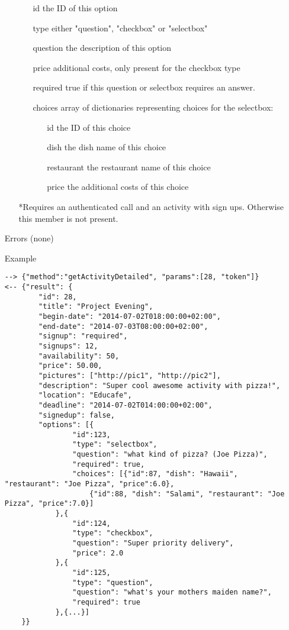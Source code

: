 \documentclass[a4paper]{scrreprt}
\begin{document}
\begin{enumerate}
\begin{enumerate}
\begin{enumerate}
        \item[id] the ID of this option
        \item[type] either "question", "checkbox" or "selectbox"
        \item[question] the description of this option
        \item[price] additional costs, only present for the checkbox type
        \item[required] true if this question or selectbox requires an answer.
        \item[choices] array of dictionaries representing choices for the selectbox:
    	\begin{enumerate}
        	\item[id] the ID of this choice
            \item[dish] the dish name of this choice
            \item[restaurant] the restaurant name of this choice
            \item[price] the additional costs of this choice
            \end{enumerate}
        \end{enumerate}
    \item[] *Requires an authenticated call and an activity with sign ups. Otherwise this member is not present.
	\end{enumerate}
\item[Errors] (none)
\item[Example]
\begin{lstlisting}
--> {"method":"getActivityDetailed", "params":[28, "token"]}
<-- {"result": {
        "id": 28,
        "title": "Project Evening",
        "begin-date": "2014-07-02T018:00:00+02:00",
        "end-date": "2014-07-03T08:00:00+02:00",
        "signup": "required",
        "signups": 12,
        "availability": 50,
        "price": 50.00,
        "pictures": ["http://pic1", "http://pic2"],
        "description": "Super cool awesome activity with pizza!",
        "location": "Educafe",
        "deadline": "2014-07-02T014:00:00+02:00",
        "signedup": false,
        "options": [{
            	"id":123,
                "type": "selectbox",
                "question": "what kind of pizza? (Joe Pizza)",
                "required": true,
                "choices": [{"id":87, "dish": "Hawaii", "restaurant": "Joe Pizza", "price":6.0},
                    {"id":88, "dish": "Salami", "restaurant": "Joe Pizza", "price":7.0}]
            },{
            	"id":124,
                "type": "checkbox",
                "question": "Super priority delivery",
                "price": 2.0
            },{
            	"id":125,
                "type": "question",
                "question": "what's your mothers maiden name?",
                "required": true
            },{...}]
    }}
\end{lstlisting}
\end{enumerate}
\end{document}
